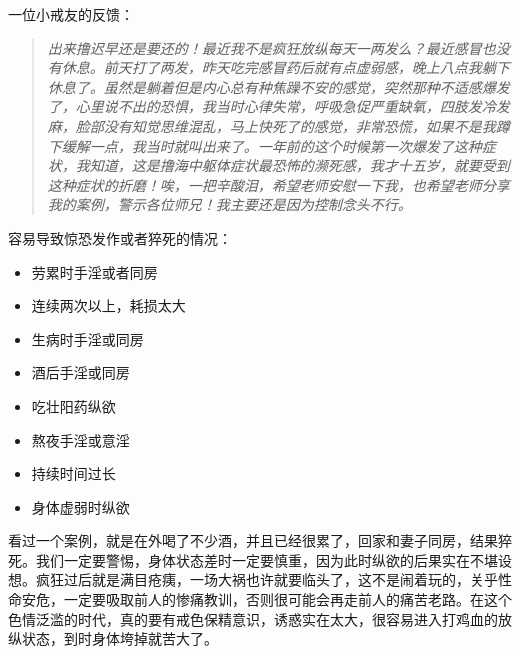 \begin{case}
    一位小戒友的反馈：\begin{quote}\it
        出来撸迟早还是要还的！最近我不是疯狂放纵每天一两发么？最近感冒也没有休息。前天打了两发，昨天吃完感冒药后就有点虚弱感，晚上八点我躺下休息了。虽然是躺着但是内心总有种焦躁不安的感觉，突然那种不适感爆发了，心里说不出的恐惧，我当时心律失常，呼吸急促严重缺氧，四肢发冷发麻，脸部没有知觉思维混乱，马上快死了的感觉，非常恐慌，如果不是我蹲下缓解一点，我当时就叫出来了。一年前的这个时候第一次爆发了这种症状，我知道，这是撸海中躯体症状最恐怖的濒死感，我才十五岁，就要受到这种症状的折磨！唉，一把辛酸泪，希望老师安慰一下我，也希望老师分享我的案例，警示各位师兄！我主要还是因为控制念头不行。
    \end{quote}

    容易导致惊恐发作或者猝死的情况：\begin{multicols}{2}
        \begin{itemize}
            \item 劳累时手淫或者同房
            \item 连续两次以上，耗损太大
            \item 生病时手淫或同房
            \item 酒后手淫或同房
            \item 吃壮阳药纵欲
            \item 熬夜手淫或意淫
            \item 持续时间过长
            \item 身体虚弱时纵欲
        \end{itemize}
    \end{multicols}

    看过一个案例，就是在外喝了不少酒，并且已经很累了，回家和妻子同房，结果猝死。我们一定要警惕，身体状态差时一定要慎重，因为此时纵欲的后果实在不堪设想。疯狂过后就是满目疮痍，一场大祸也许就要临头了，这不是闹着玩的，关乎性命安危，一定要吸取前人的惨痛教训，否则很可能会再走前人的痛苦老路。在这个色情泛滥的时代，真的要有戒色保精意识，诱惑实在太大，很容易进入打鸡血的放纵状态，到时身体垮掉就苦大了。
\end{case}

